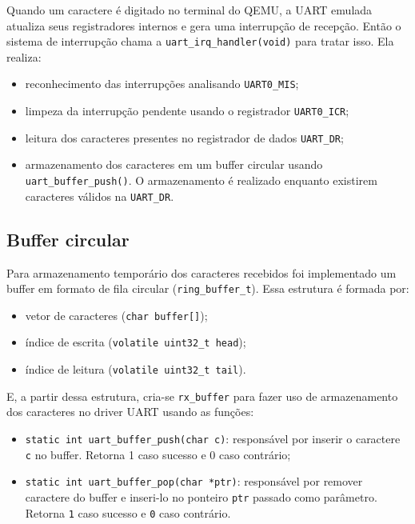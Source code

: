 Quando um caractere é digitado no terminal do QEMU, a UART emulada atualiza seus registradores internos e gera uma interrupção de recepção. Então o sistema de interrupção chama a \texttt{uart\_irq\_handler(void)} para tratar isso. Ela realiza:

\begin{itemize}
    \item reconhecimento das interrupções analisando \texttt{UART0\_MIS};
    
    \item limpeza da interrupção pendente usando o registrador \texttt{UART0\_ICR};
    
    \item leitura dos caracteres presentes no registrador de dados \texttt{UART\_DR};
    
    \item armazenamento dos caracteres em um buffer circular usando \texttt{uart\_buffer\_push()}. O armazenamento é realizado enquanto existirem caracteres válidos na \texttt{UART\_DR}.
\end{itemize}

\subsection{Buffer circular}

Para armazenamento temporário dos caracteres recebidos foi implementado um buffer em formato de fila circular (\texttt{ring\_buffer\_t}). Essa estrutura é formada por:

\begin{itemize}
    \item vetor de caracteres (\texttt{char buffer[]});
    
    \item índice de escrita (\texttt{volatile uint32\_t head});
    
    \item índice de leitura (\texttt{volatile uint32\_t tail}).
\end{itemize}

E, a partir dessa estrutura, cria-se \texttt{rx\_buffer} para fazer uso de armazenamento dos caracteres no driver UART usando as funções:

\begin{itemize}
    \item \texttt{static int uart\_buffer\_push(char c)}: responsável por inserir o caractere \texttt{c} no buffer. Retorna 1 caso sucesso e 0 caso contrário;
    
    \item \texttt{static int uart\_buffer\_pop(char *ptr)}: responsável por remover caractere do buffer e inseri-lo no ponteiro \texttt{ptr} passado como parâmetro. Retorna \texttt{1} caso sucesso e \texttt{0} caso contrário.
\end{itemize}

